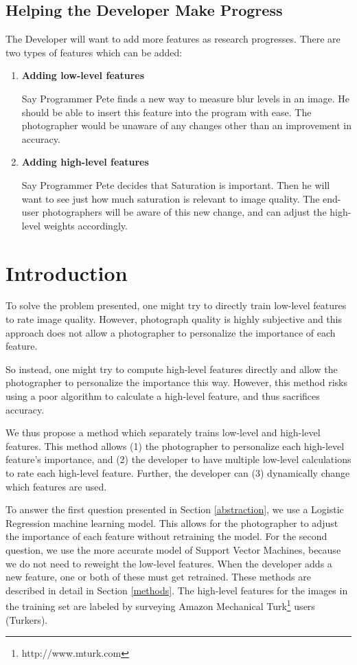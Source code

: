 \documentclass[11pt,letter]{article}
\begin{document}
\subsection{Helping the Developer Make Progress}
\label{easeofprogramming}
The Developer will want to add more features as research progresses. There are two types of features which can be added:
\begin{enumerate}
\item \textbf{Adding low-level features}

Say Programmer Pete finds a new way to measure blur levels in an image. He should be able to insert this feature into the program with ease. The photographer would be unaware of any changes other than an improvement in accuracy.

\item \textbf{Adding high-level features}

Say Programmer Pete decides that Saturation is important. Then he will want to see just how much saturation is relevant to image quality. The end-user photographers will be aware of this new change, and can adjust the high-level weights accordingly.
\end{enumerate}

\section{Introduction}
To solve the problem presented, one might try to directly train low-level features to rate image quality. However, photograph quality is highly subjective and this approach does not allow a photographer to personalize the importance of each feature.

So instead, one might try to compute high-level features directly and allow the photographer to personalize the importance this way. However, this method risks using a poor algorithm to calculate a high-level feature, and thus sacrifices accuracy.

We thus propose a method which separately trains low-level and high-level features. This method allows (1) the photographer to personalize each high-level feature's importance, and (2) the developer to have multiple low-level calculations to rate each high-level feature. Further, the developer can (3) dynamically change which features are used.

To answer the first question presented in Section \ref{abstraction}, we use a Logistic Regression machine learning model. This allows for the photographer to adjust the importance of each feature without retraining the model. For the second question, we use the more accurate model of Support Vector Machines, because we do not need to reweight the low-level features. When the developer adds a new feature, one or both of these must get retrained. These methods are described in detail in Section \ref{methods}. The high-level features for the images in the training set are labeled by surveying Amazon Mechanical Turk\footnote{http://www.mturk.com} users (Turkers).
\end{document}
